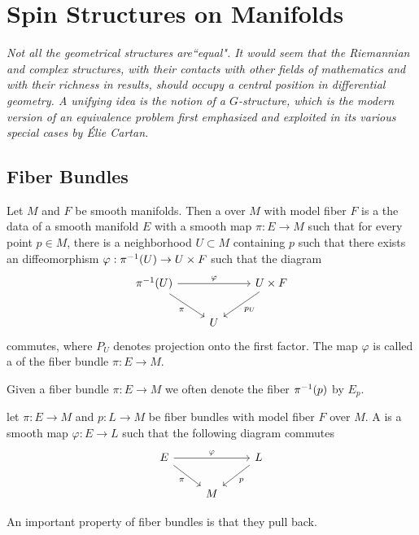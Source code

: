 \chapter{Spin Structures on Manifolds}
%
\subsectionend $ $\\
%
\emph{Not all the geometrical structures are``equal". It would seem that the
Riemannian and complex structures, with their contacts with other fields of
mathematics and with their richness in results, should occupy a central position
in differential geometry. A unifying idea is the notion of a $G$-structure, which
is the modern version of an equivalence problem first emphasized and exploited
in its various special cases by \'Elie Cartan.} \\
%
%
\subsectionend
%
\section{Fiber Bundles}
%
\begin{defn}
Let $M$ and $F$ be smooth manifolds. Then a  over $M$ with
model fiber $F$ is a the data of a smooth manifold $E$ with a smooth map
$\pi : E \to M$ such that for every point $p \in M$, there is a neighborhood
$U \subset M$ containing $p$ such that there exists an diffeomorphism
$\varphi : \pi^{-1}(U) \to U \times F$ such that the diagram
\[\begin{tikzcd}
\pi\inv(U) \ar[rr, "\varphi"] \ar[dr, "\pi"']&& U \times F \ar[dl, "p_U"] \\
& U
\end{tikzcd}\]
commutes, where $P_U$ denotes projection onto the first factor. The map $\varphi$ is
called a  of the fiber bundle $\pi : E \to M$.
\end{defn}
%
Given a fiber bundle $\pi : E \to M$ we often denote the fiber $\pi^{-1}(p)$
by $E_p$.
%
\begin{defn}
let $\pi : E \to M$ and $p : L \to M$ be fiber bundles with model fiber $F$
over $M$. A  is a smooth map $\varphi : E \to L$ such
that the following diagram commutes
\[\begin{tikzcd}
E \ar[dr, "\pi"']\ar[rr,"\varphi"] & & L \ar[dl, "p"] \\
& M
\end{tikzcd}\]
\end{defn}
%
An important property of fiber bundles is that they pull back.
